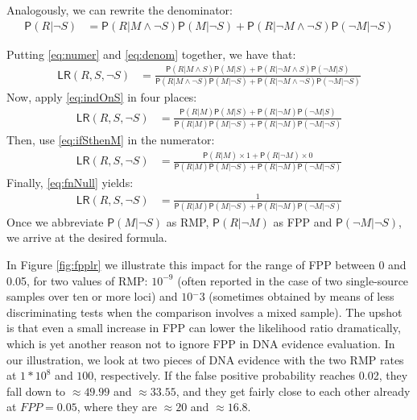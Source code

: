 \documentclass[
  10pt,
  dvipsnames,enabledeprecatedfontcommands]{scrartcl}
\newcommand{\n}{\neg}
\newcommand{\et}{\wedge}
\newcommand{\pr}[1]{\mathsf{P}(#1)}
\begin{document}
\noindent  Analogously, we can rewrite the denominator: \begin{align}
\label{eq:denom}
\pr{R \vert \n S} & = \pr{R \vert M \et \n S}\pr{M \vert \n S} +
\pr{R \vert \n M \et \n S}\pr{\n M \vert \n S}
\end{align}

Putting \eqref{eq:numer} and \eqref{eq:denom} together, we have that:
\begin{align}
\label{eq:LRfp1}
\mathsf{LR}(R,S, \n S) & = \frac{\pr{R \vert M \et S}\pr{M \vert S} + \pr{R \vert \n M \et S}\pr{\n M \vert S}}
{\pr{R \vert M \et \n S}\pr{M \vert \n S} +
\pr{R \vert \n M \et \n S}\pr{\n M \vert \n S}}
\end{align} Now, apply \eqref{eq:indOnS} in four places: \begin{align}
\label{eq:LRfp2}
\mathsf{LR}(R,S, \n S) & = \frac{
\pr{R \vert M}\pr{M \vert S} + \pr{R \vert \n M}\pr{\n M \vert S}
}{
\pr{R \vert M }\pr{M \vert \n S} +
\pr{R \vert \n M}\pr{\n M \vert \n S}
}
\end{align} Then, use \eqref{eq:ifSthenM} in the numerator:
\begin{align}
\label{eq:LRfp3}
\mathsf{LR}(R,S, \n S) & = \frac{
\pr{R \vert M} \times 1 + \pr{R \vert \n M}\times 0
}{
\pr{R \vert M }\pr{M \vert \n S} +
\pr{R \vert \n M}\pr{\n M \vert \n S}
}
\end{align} Finally, \eqref{eq:fnNull} yields: \begin{align}
\label{eq:LRfp4}
\mathsf{LR}(R,S, \n S) & = \frac{1}
{\pr{R \vert  M}\pr{ M \vert \n S} + \pr{R \vert \n M}\pr{\n M \vert \n S}}
\end{align} Once we abbreviate \(\pr{M\vert \n S}\) as RMP,
\(\pr{R \vert \n M}\) as FPP and \(\pr{\n M \vert \n S}\), we arrive at
the desired formula.

In Figure \ref{fig:fpplr} we illustrate this impact for the range of FPP
between 0 and 0.05, for two values of RMP: \(10^{-9}\) (often reported
in the case of two single-source samples over ten or more loci) and
\(10{^-3}\) (sometimes obtained by means of less discriminating tests
when the comparison involves a mixed sample). The upshot is that even a
small increase in FPP can lower the likelihood ratio dramatically, which
is yet another reason not to ignore FPP in DNA evidence evaluation. In
our illustration, we look at two pieces of DNA evidence with the two RMP
rates at \(1*10^8\) and \(100\), respectively. If the false positive
probability reaches 0.02, they fall down to \(\approx 49.99\) and
\(\approx 33.55\), and they get fairly close to each other already at
\(FPP=0.05\), where they are \(\approx 20\) and \(\approx 16.8\).
\end{document}
